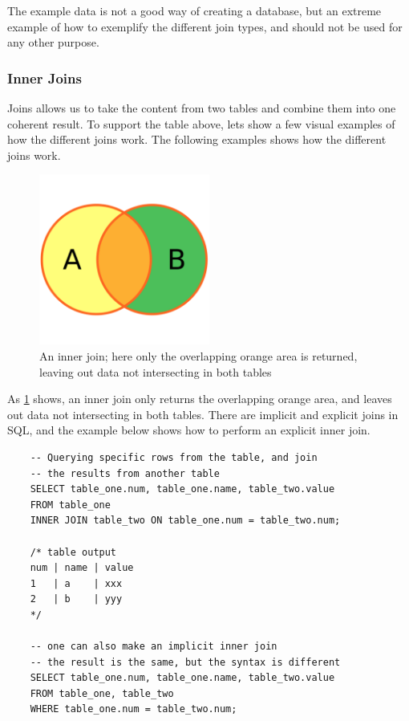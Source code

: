 The example data is not a good way of creating a database, but an extreme example of how to exemplify the different join types, and should not be used for any other purpose.

\subsubsection{Inner Joins}
Joins allows us to take the content from two tables and combine them into one coherent result. To support the table above, lets show a few visual examples of how the different joins work. The following examples shows how the different joins work.

\begin{figure}[H]
    \centering
    \includegraphics[width=0.5\textwidth]{content/1-relational-databases/figures/joins/innerjoin.png}
    \caption{An inner join; here only the overlapping orange area is returned, leaving out data not intersecting in both tables}
    \label{fig:1.innerjoin}
\end{figure}

As \cref{fig:1.innerjoin} shows, an inner join only returns the overlapping orange area, and leaves out data not intersecting in both tables. There are implicit and explicit joins in SQL, and the example below shows how to perform an explicit inner join.

\begin{verbatim}
    -- Querying specific rows from the table, and join 
    -- the results from another table
    SELECT table_one.num, table_one.name, table_two.value
    FROM table_one
    INNER JOIN table_two ON table_one.num = table_two.num;

    /* table output
    num | name | value
    1   | a    | xxx
    2   | b    | yyy
    */

    -- one can also make an implicit inner join
    -- the result is the same, but the syntax is different
    SELECT table_one.num, table_one.name, table_two.value
    FROM table_one, table_two
    WHERE table_one.num = table_two.num;
\end{verbatim}

